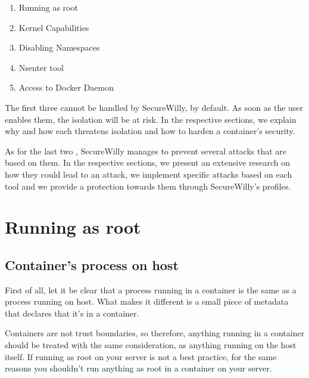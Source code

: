 \begin{enumerate}
\item Running as root
\item Kernel Capabilities
\item Disabling Namespaces
\item Nsenter tool
\item Access to Docker Daemon
\end{enumerate}

The first three  cannot be handled by SecureWilly, by default. As soon as the user enables them, the isolation will be at risk. In the respective sections, we explain why and how each  threatens isolation and how to harden a container's security.

As for the last two , SecureWilly manages to prevent several attacks that are based on them. In the respective sections, we present an extensive research on how they could lead to an attack, we implement specific attacks based on each tool and we provide a protection towards them through SecureWilly's profiles.

\section{Running as root}
\subsection{Container's process on host}
First of all, let it be clear that a process running in a container is the same as a process running on host. What makes it different is a small piece of metadata that declares that it's in a container. \cite{runningroot}

Containers are not trust boundaries, so therefore, anything running in a container should be treated with the same consideration, as anything running on the host itself.
If running as root on your server is not a best practice, for the same reasons you shouldn't run anything as root in a container on your server.
